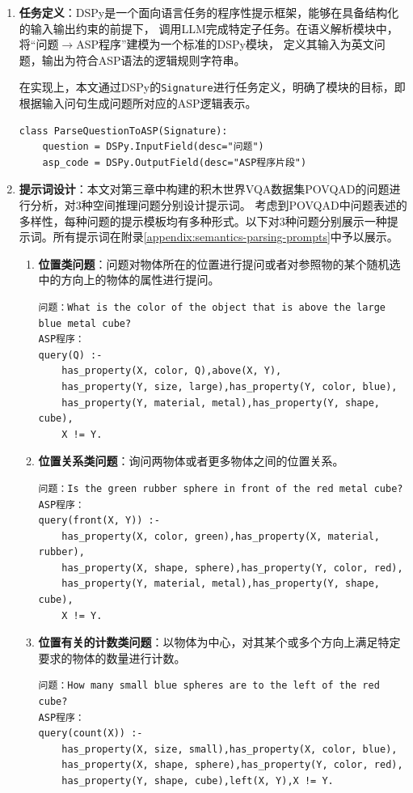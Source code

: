 \begin{enumerate}[nosep]
\item \textbf{任务定义}：DSPy是一个面向语言任务的程序性提示框架，能够在具备结构化的输入输出约束的前提下，
调用LLM完成特定子任务。在语义解析模块中，将“问题$\rightarrow$ASP程序”建模为一个标准的DSPy模块，
定义其输入为英文问题，输出为符合ASP语法的逻辑规则字符串。

在实现上，本文通过DSPy的\texttt{Signature}进行任务定义，明确了模块的目标，即
根据输入问句生成问题所对应的ASP逻辑表示。
\begin{lstlisting}
class ParseQuestionToASP(Signature):
    question = DSPy.InputField(desc="问题")
    asp_code = DSPy.OutputField(desc="ASP程序片段")
\end{lstlisting}
\item \textbf{提示词设计}：本文对第三章中构建的积木世界VQA数据集POVQAD的问题进行分析，对3种空间推理问题分别设计提示词。
考虑到POVQAD中问题表述的多样性，每种问题的提示模板均有多种形式。以下对3种问题分别展示一种提示词。所有提示词在附录\ref{appendix:semantics-parsing-prompts}中予以展示。
\begin{enumerate}[nosep]
\item \textbf{位置类问题}：问题对物体所在的位置进行提问或者对参照物的某个随机选中的方向上的物体的属性进行提问。
\begin{lstlisting}
问题：What is the color of the object that is above the large blue metal cube?
ASP程序：
query(Q) :-
    has_property(X, color, Q),above(X, Y),
    has_property(Y, size, large),has_property(Y, color, blue),
    has_property(Y, material, metal),has_property(Y, shape, cube),
    X != Y.
\end{lstlisting}
\item \textbf{位置关系类问题}：询问两物体或者更多物体之间的位置关系。
\begin{lstlisting}
问题：Is the green rubber sphere in front of the red metal cube?
ASP程序：
query(front(X, Y)) :-
    has_property(X, color, green),has_property(X, material, rubber),
    has_property(X, shape, sphere),has_property(Y, color, red),
    has_property(Y, material, metal),has_property(Y, shape, cube),
    X != Y.
\end{lstlisting}
\item \textbf{位置有关的计数类问题}：以物体为中心，对其某个或多个方向上满足特定要求的物体的数量进行计数。
\begin{lstlisting}
问题：How many small blue spheres are to the left of the red cube?
ASP程序：
query(count(X)) :-
    has_property(X, size, small),has_property(X, color, blue),
    has_property(X, shape, sphere),has_property(Y, color, red),
    has_property(Y, shape, cube),left(X, Y),X != Y.
\end{lstlisting}
\end{enumerate}


\end{enumerate}

